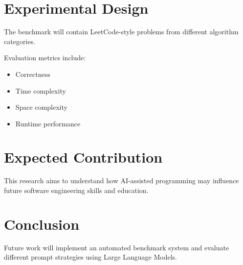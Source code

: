 \documentclass[11pt]{article}
\begin{document}
\section{Experimental Design}

The benchmark will contain LeetCode-style problems from different algorithm
categories.

Evaluation metrics include:

\begin{itemize}
    \item Correctness
    \item Time complexity
    \item Space complexity
    \item Runtime performance
\end{itemize}


\section{Expected Contribution}

This research aims to understand how AI-assisted programming may influence
future software engineering skills and education.


\section{Conclusion}

Future work will implement an automated benchmark system and evaluate
different prompt strategies using Large Language Models.
\end{document}

